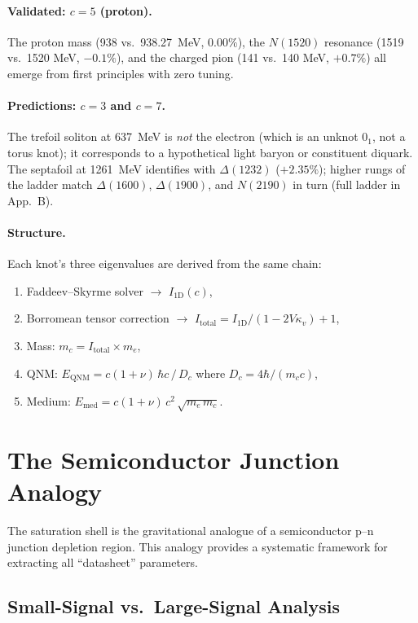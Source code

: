 \paragraph{Validated: $c = 5$ (proton).}
The proton mass (938 vs.\ 938.27~MeV, $0.00\%$), the $N(1520)$ resonance (1519 vs.\ 1520 MeV, $-0.1\%$), and the charged pion (141 vs.\ 140 MeV, $+0.7\%$) all emerge from first principles with zero tuning.

\paragraph{Predictions: $c = 3$ and $c = 7$.}
The trefoil soliton at 637~MeV is \emph{not} the electron (which is an unknot $0_1$, not a torus knot); it corresponds to a hypothetical light baryon or constituent diquark.  The septafoil at 1261~MeV identifies with $\Delta(1232)$ ($+2.35\%$); higher rungs of the ladder match $\Delta(1600)$, $\Delta(1900)$, and $N(2190)$ in turn (full ladder in App.~B).

\paragraph{Structure.}
Each knot's three eigenvalues are derived from the same chain:
\begin{enumerate}
    \item Faddeev--Skyrme solver $\to$ $I_{1\mathrm{D}}(c)$,
    \item Borromean tensor correction $\to$ $I_\mathrm{total} = I_{1\mathrm{D}}/(1 - 2V\kappa_v) + 1$,
    \item Mass: $m_c = I_\mathrm{total} \times m_e$,
    \item QNM: $E_\mathrm{QNM} = c(1+\nu)\,\hbar c\,/\,D_c$ where $D_c = 4\hbar/(m_c c)$,
    \item Medium: $E_\mathrm{med} = c(1+\nu)\,c^2\,\sqrt{m_e\,m_c}$.
\end{enumerate}


\section{The Semiconductor Junction Analogy}
\label{sec:junction_analogy}

The saturation shell is the gravitational analogue of a semiconductor p--n junction depletion region. This analogy provides a systematic framework for extracting all ``datasheet'' parameters.

\subsection{Small-Signal vs.\ Large-Signal Analysis}

